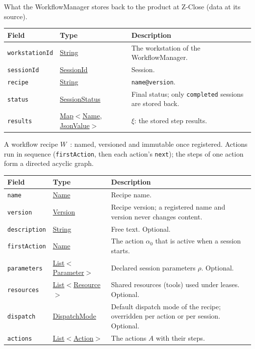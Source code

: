 \documentclass[a4paper]{arrowhead}
\newcommand{\mref}[1]{{\textcolor{ArrowheadPurple}{\hyperref[sec:model:#1]{#1}}}}
\newcommand{\pref}[1]{{\textcolor{ArrowheadGrey}{\hyperref[sec:model:primitives:#1]{#1}}}}
\begin{document}
What the WorkflowManager stores back to the product at Z-Close (data at its source).

{\small
\begin{longtable}{|p{3.9cm}|p{4.4cm}|p{7.5cm}|}

\hline
\rowcolor{gray!33} Field & Type & Description \\ \hline
\endhead
\texttt{workstationId} & \pref{String} & The workstation of the WorkflowManager. \\ \hline
\texttt{sessionId} & \pref{SessionId} & Session. \\ \hline
\texttt{recipe} & \pref{String} & \texttt{name@version}. \\ \hline
\texttt{status} & \mref{SessionStatus} & Final status; only \texttt{completed} sessions are stored back. \\ \hline
\texttt{results} & \pref{Map}$<$\pref{Name}, \pref{JsonValue}$>$ & $\xi$: the stored step results. \\ \hline
\end{longtable}
}

A workflow recipe $W$~\cite{varga2026}: named, versioned and immutable once registered. Actions run in sequence (\texttt{firstAction}, then each action's \texttt{next}); the steps of one action form a directed acyclic graph.

{\small
\begin{longtable}{|p{3.9cm}|p{4.4cm}|p{7.5cm}|}

\hline
\rowcolor{gray!33} Field & Type & Description \\ \hline
\endhead
\texttt{name} & \pref{Name} & Recipe name. \\ \hline
\texttt{version} & \pref{Version} & Recipe version; a registered name and version never changes content. \\ \hline
\texttt{description} & \pref{String} & Free text. Optional. \\ \hline
\texttt{firstAction} & \pref{Name} & The action $\alpha_0$ that is active when a session starts. \\ \hline
\texttt{parameters} & \pref{List}$<$\mref{Parameter}$>$ & Declared session parameters $\rho$. Optional. \\ \hline
\texttt{resources} & \pref{List}$<$\mref{Resource}$>$ & Shared resources (tools) used under leases. Optional. \\ \hline
\texttt{dispatch} & \mref{DispatchMode} & Default dispatch mode of the recipe; overridden per action or per session. Optional. \\ \hline
\texttt{actions} & \pref{List}$<$\mref{Action}$>$ & The actions $A$ with their steps. \\ \hline
\end{longtable}
}
\end{document}
